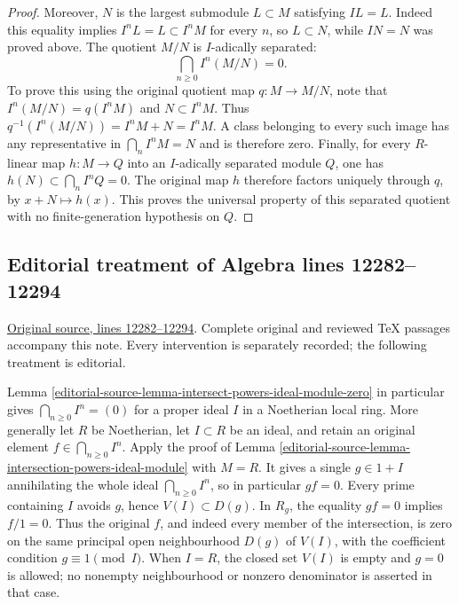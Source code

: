 \begin{proof}
Moreover, $N$ is the largest submodule $L\subset M$ satisfying
$IL=L$. Indeed this equality implies $I^nL=L\subset I^nM$
for every $n$, so $L\subset N$, while $IN=N$ was proved above.
The quotient $M/N$ is $I$-adically separated:
$$
\bigcap_{n\geq0} I^n(M/N)=0.
$$
To prove this using the original quotient map $q:M\to M/N$,
note that $I^n(M/N)=q(I^nM)$ and $N\subset I^nM$.
Thus $q^{-1}(I^n(M/N))=I^nM+N=I^nM$.
A class belonging to every such image has any representative in
$\bigcap_n I^nM=N$ and is therefore zero. Finally, for every
$R$-linear map $h:M\to Q$ into an $I$-adically separated
module $Q$, one has $h(N)\subset\bigcap_n I^nQ=0$.
The original map $h$ therefore factors uniquely through $q$,
by $x+N\mapsto h(x)$. This proves the universal property of
this separated quotient with no finite-generation hypothesis on $Q$.
\end{proof}


\subsection{Editorial treatment of Algebra lines 12282--12294}

\hypertarget{algebra-context-163}{}

\noindent\href{https://github.com/stacks/stacks-project/blob/a04446e57ec1fbc252a871afcec7752fb2807b14/algebra.tex\#L12282}{Original source, lines 12282--12294}. Complete original and reviewed TeX passages accompany this note. Every intervention is separately recorded; the following treatment is editorial.


\begin{remark}
\label{editorial-source-remark-intersection-powers-ideal}
Lemma \ref{editorial-source-lemma-intersect-powers-ideal-module-zero} in particular
gives $\bigcap_{n\geq0}I^n=(0)$ for a proper ideal $I$ in a
Noetherian local ring. More generally let $R$ be Noetherian,
let $I\subset R$ be an ideal, and retain an original element
$f\in\bigcap_{n\geq0}I^n$. Apply the proof of
Lemma \ref{editorial-source-lemma-intersection-powers-ideal-module} with $M=R$.
It gives a single $g\in1+I$ annihilating the whole ideal
$\bigcap_{n\geq0}I^n$, so in particular $gf=0$.
Every prime containing $I$ avoids $g$, hence
$V(I)\subset D(g)$. In $R_g$, the equality $gf=0$ implies
$f/1=0$. Thus the original $f$, and indeed every member of the
intersection, is zero on the same principal open neighbourhood
$D(g)$ of $V(I)$, with the coefficient condition $g\equiv1\pmod I$.
When $I=R$, the closed set $V(I)$ is empty and $g=0$ is
allowed; no nonempty neighbourhood or nonzero denominator is
asserted in that case.
\end{remark}



